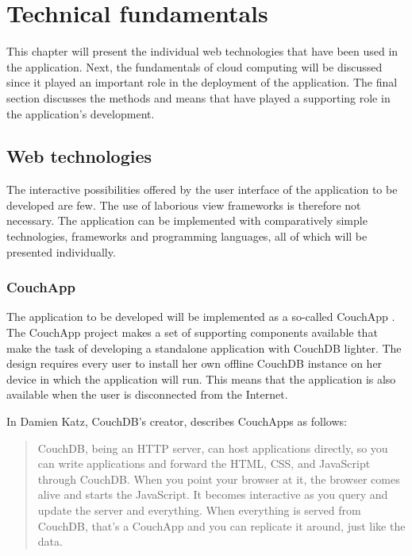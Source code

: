 \chapter{Technical fundamentals}
\label{chap:grundlagen}

This chapter will present the individual web technologies that have been used in the application. Next, the fundamentals of cloud computing will be discussed since it played an important role in the deployment of the application. The final section discusses the methods and means that have played a supporting role in the application's development.


\section{Web technologies}
\label{sec:webtechnologien}

The interactive possibilities offered by the user interface of the application to be developed are few. The use of laborious view frameworks is therefore not necessary. The application can be implemented with comparatively simple technologies, frameworks and programming languages, all of which will be presented individually.


\subsection{CouchApp}
\label{subsec:couchapp}

The application to be developed will be implemented as a so-called CouchApp \cite{couch:couchapp}. The CouchApp project makes a set of supporting components available that make the task of developing a standalone application with CouchDB lighter. The design requires every user to install her own offline CouchDB instance on her device in which the application will run. This means that the application is also available when the user is disconnected from the Internet.

In \cite{couchapp:interview} Damien Katz, CouchDB's creator, describes CouchApps as follows:

\begin{quote}
CouchDB, being an HTTP server, can host applications directly, so you can write applications and forward the HTML, CSS, and JavaScript through CouchDB. When you point your browser at it, the browser comes alive and starts the JavaScript. It becomes interactive as you query and update the server and everything. When everything is served from CouchDB, that's a CouchApp and you can replicate it around, just like the data. 
\end{quote}

